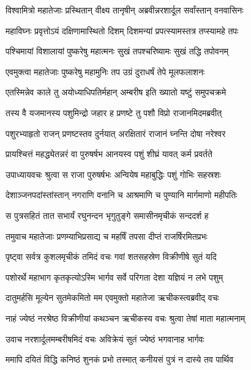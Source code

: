 
\twolineshloka
{विश्वामित्रो महातेजाः प्रस्थितान् वीक्ष्य तानृषीन्}
{अब्रवीन्नरशार्दूल सर्वांस्तान् वनवासिनः} %

\twolineshloka
{महाविघ्नः प्रवृत्तोऽयं दक्षिणामास्थितो दिशम्}
{दिशमन्यां प्रपत्स्यामस्तत्र तप्स्यामहे तपः} %

\twolineshloka
{पश्चिमायां विशालायां पुष्करेषु महात्मनः}
{सुखं तपश्चरिष्यामः सुखं तद्धि तपोवनम्} %

\twolineshloka
{एवमुक्त्वा महातेजाः पुष्करेषु महामुनिः}
{तप उग्रं दुराधर्षं तेपे मूलफलाशनः} %

\twolineshloka
{एतस्मिन्नेव काले तु अयोध्याधिपतिर्महान्}
{अम्बरीष इति ख्यातो यष्टुं समुपचक्रमे} %

\twolineshloka
{तस्य वै यजमानस्य पशुमिन्द्रो जहार ह}
{प्रणष्टे तु पशौ विप्रो राजानमिदमब्रवीत्} %

\twolineshloka
{पशुरभ्याहृतो राजन् प्रणष्टस्तव दुर्नयात्}
{अरक्षितारं राजानं घ्नन्ति दोषा नरेश्वर} %

\twolineshloka
{प्रायश्चित्तं महद्ध्येतन्नरं वा पुरुषर्षभ}
{आनयस्व पशुं शीघ्रं यावत् कर्म प्रवर्तते} %

\twolineshloka
{उपाध्यायवचः श्रुत्वा स राजा पुरुषर्षभः}
{अन्वियेष महाबुद्धिः पशुं गोभिः सहस्रशः} %

\twolineshloka
{देशाञ्जनपदांस्तांस्तान् नगराणि वनानि च}
{आश्रमाणि च पुण्यानि मार्गमाणो महीपतिः} %

\twolineshloka
{स पुत्रसहितं तात सभार्यं रघुनन्दन}
{भृगुतुङ्गे समासीनमृचीकं सन्ददर्श ह} %

\twolineshloka
{तमुवाच महातेजाः प्रणम्याभिप्रसाद्य च}
{महर्षिं तपसा दीप्तं राजर्षिरमितप्रभः} %

\twolineshloka
{पृष्ट्वा सर्वत्र कुशलमृचीकं तमिदं वचः}
{गवां शतसहस्रेण विक्रीणीषे सुतं यदि} %

\twolineshloka
{पशोरर्थे महाभाग कृतकृत्योऽस्मि भार्गव}
{सर्वे परिगता देशा यज्ञियं न लभे पशुम्} %

\twolineshloka
{दातुमर्हसि मूल्येन सुतमेकमितो मम}
{एवमुक्तो महातेजा ऋचीकस्त्वब्रवीद् वचः} %

\twolineshloka
{नाहं ज्येष्ठं नरश्रेष्ठ विक्रीणीयां कथञ्चन}
{ऋचीकस्य वचः श्रुत्वा तेषां माता महात्मनाम्} %

\twolineshloka
{उवाच नरशार्दूलमम्बरीषमिदं वचः}
{अविक्रेयं सुतं ज्येष्ठं भगवानाह भार्गवः} %

\twolineshloka
{ममापि दयितं विद्धि कनिष्ठं शुनकं प्रभो}
{तस्मात् कनीयसं पुत्रं न दास्ये तव पार्थिव} %

